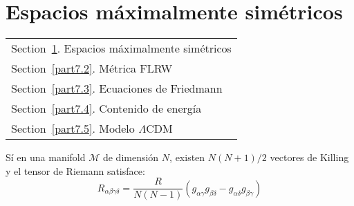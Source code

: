 \documentclass[../main]{subfiles}
\begin{document}
\section{Espacios máximalmente simétricos}\label{part7.1}
        \begin{margintable}\vspace{.8in}\footnotesize
		\begin{tabularx}{\marginparwidth}{|X}
		  Section~\ref{part7.1}. Espacios máximalmente simétricos\\
            Section~\ref{part7.2}. Métrica FLRW\\
            Section~\ref{part7.3}. Ecuaciones de Friedmann\\
            Section~\ref{part7.4}. Contenido de energía\\
            Section~\ref{part7.5}. Modelo $\Lambda$CDM\\
		\end{tabularx}
	\end{margintable}

Sí en una manifold $\mathcal{M}$ de dimensión $N$, existen $N(N+1)/2$ vectores de Killing y el tensor de Riemann satisface:
\begin{equation}
    R_{\alpha\beta\gamma\delta}=\dfrac{R}{N(N-1)}(g_{\alpha\gamma}g_{\beta\delta}-g_{\alpha\delta}g_{\beta\gamma})
\end{equation}
\end{document}
